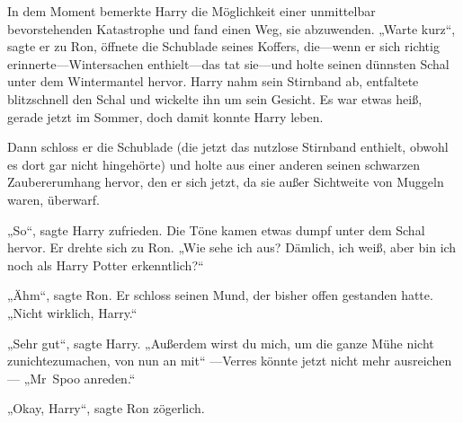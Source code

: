 In dem Moment bemerkte Harry die Möglichkeit einer unmittelbar bevorstehenden Katastrophe und fand einen Weg, sie abzuwenden. „Warte kurz“, sagte er zu Ron, öffnete die Schublade seines Koffers, die—wenn er sich richtig erinnerte—Wintersachen enthielt—das tat sie—und holte seinen dünnsten Schal unter dem Wintermantel hervor. Harry nahm sein Stirnband ab, entfaltete blitzschnell den Schal und wickelte ihn um sein Gesicht. Es war etwas heiß, gerade jetzt im Sommer, doch damit konnte Harry leben.

Dann schloss er die Schublade (die jetzt das nutzlose Stirnband enthielt, obwohl es dort gar nicht hingehörte) und holte aus einer anderen seinen schwarzen Zaubererumhang hervor, den er sich jetzt, da sie außer Sichtweite von Muggeln waren, überwarf.

„So“, sagte Harry zufrieden. Die Töne kamen etwas dumpf unter dem Schal hervor. Er drehte sich zu Ron. „Wie sehe ich aus? Dämlich, ich weiß, aber bin ich noch als Harry Potter erkenntlich?“

„Ähm“, sagte Ron. Er schloss seinen Mund, der bisher offen gestanden hatte. „Nicht wirklich, Harry.“

„Sehr gut“, sagte Harry. „Außerdem wirst du mich, um die ganze Mühe nicht zunichtezumachen, von nun an mit“ —Verres könnte jetzt nicht mehr ausreichen— „Mr~Spoo anreden.“

„Okay, Harry“, sagte Ron zögerlich.

